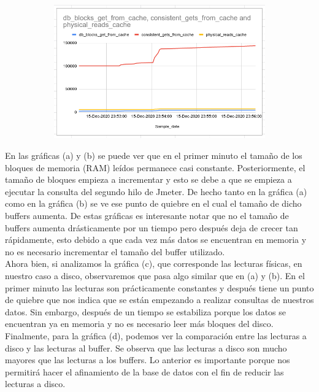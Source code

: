 \documentclass{article}
\begin{document}
\begin{figure}[ht!]
\begin{subfigure}{0.5\textwidth}
    \caption{}
  \end{subfigure} 
  \begin{subfigure}{0.5\textwidth}
    \centering  
    \includegraphics[width=0.9\linewidth]{grafica04}
    \caption{}
  \end{subfigure} 
\end{figure}

En las gráficas (a) y (b) se puede ver que en el primer minuto el tamaño de los
bloques de memoria (RAM) leídos permanece casi constante. Posteriormente, el
tamaño de bloques empieza a incrementar y esto se debe a que se empieza a
ejecutar la consulta del segundo hilo de Jmeter. De hecho tanto en la gráfica
(a) como en la gráfica (b) se ve ese punto de quiebre en el cual el tamaño de 
dicho buffers aumenta. De estas gráficas es interesante notar que no 
el tamaño de buffers aumenta drásticamente por un tiempo pero después deja de
crecer tan rápidamente, esto debido a que cada vez más datos se encuentran en
memoria y no es necesario incrementar el tamaño del buffer utilizado.\\

Ahora bien, si analizamos la gráfica (c), que corresponde las lecturas físicas,
en nuestro caso a disco, observaremos que pasa algo similar que en (a) y (b).
En el primer minuto las lecturas son prácticamente constantes y después
tiene un punto de quiebre que nos indica que se están empezando a realizar 
consultas de nuestros datos. Sin embargo, después de un tiempo se estabiliza 
porque los datos se encuentran ya en memoria y no es necesario leer más bloques
del disco.\\

Finalmente, para la gráfica (d), podemos ver la comparación entre las lecturas
a disco y las lecturas al buffer. Se observa que las lecturas a disco son 
mucho mayores que las lecturas a los buffers. Lo anterior es importante porque
nos permitirá hacer el afinamiento de la base de datos con el fin de reducir
las lecturas a disco.
\end{document}
